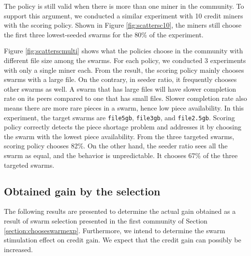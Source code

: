 The policy is still valid when there is more than one miner in the community. To support this argument, we conducted a similar experiment with 10 credit miners with the scoring policy. Shown in Figure \ref{fig:scattersc10}, the miners still choose the first three lowest-seeded swarms for the 80\% of the experiment. 

Figure \ref{fig:scatterscmulti} shows what the policies choose in the community with different file size among the swarms. For each policy, we conducted 3 experiments with only a single miner each. From the result, the scoring policy mainly chooses swarms with a large file. On the contrary, in seeder ratio, it frequently chooses other swarms as well. A swarm that has large files will have slower completion rate on its peers compared to one that has small files. Slower completion rate also means there are more rare pieces in a swarm, hence low piece availability. In this experiment, the target swarms are \texttt{file5gb}, \texttt{file3gb}, and \texttt{file2.5gb}. Scoring policy correctly detects the piece shortage problem and addresses it by choosing the swarm with the lowest piece availability. From the three targeted swarms, scoring policy chooses 82\%. On the other hand, the seeder ratio sees all the swarm as equal, and the behavior is unpredictable. It chooses 67\% of the three targeted swarms.

\subsection{Obtained gain by the selection}
\label{section:resultgain}
The following results are presented to determine the actual gain obtained as a result of swarm selection presented in the first community of Section \ref{section:chooseswarmexp}. Furthermore, we intend to determine the swarm stimulation effect on credit gain. We expect that the credit gain can possibly be increased.


